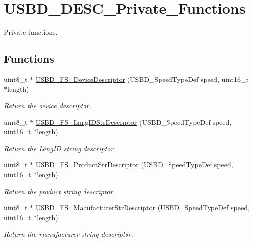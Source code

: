 \hypertarget{group__USBD__DESC__Private__Functions}{}\section{U\+S\+B\+D\+\_\+\+D\+E\+S\+C\+\_\+\+Private\+\_\+\+Functions}
\label{group__USBD__DESC__Private__Functions}


Private functions.  


\subsection*{Functions}
\begin{DoxyCompactItemize}
\item 
uint8\+\_\+t $\ast$ \hyperlink{group__USBD__DESC__Private__Functions_ga14798be38c08a37163e53167032485ff}{U\+S\+B\+D\+\_\+\+F\+S\+\_\+\+Device\+Descriptor} (U\+S\+B\+D\+\_\+\+Speed\+Type\+Def speed, uint16\+\_\+t $\ast$length)
\begin{DoxyCompactList}\small\item\em Return the device descriptor. \end{DoxyCompactList}\item 
uint8\+\_\+t $\ast$ \hyperlink{group__USBD__DESC__Private__Functions_gac02628ceb6a6a071e192dcb85063c0cc}{U\+S\+B\+D\+\_\+\+F\+S\+\_\+\+Lang\+I\+D\+Str\+Descriptor} (U\+S\+B\+D\+\_\+\+Speed\+Type\+Def speed, uint16\+\_\+t $\ast$length)
\begin{DoxyCompactList}\small\item\em Return the Lang\+ID string descriptor. \end{DoxyCompactList}\item 
uint8\+\_\+t $\ast$ \hyperlink{group__USBD__DESC__Private__Functions_ga0ec558c0303daabb851d584109a56514}{U\+S\+B\+D\+\_\+\+F\+S\+\_\+\+Product\+Str\+Descriptor} (U\+S\+B\+D\+\_\+\+Speed\+Type\+Def speed, uint16\+\_\+t $\ast$length)
\begin{DoxyCompactList}\small\item\em Return the product string descriptor. \end{DoxyCompactList}\item 
uint8\+\_\+t $\ast$ \hyperlink{group__USBD__DESC__Private__Functions_ga6427a671827813efe1a46c3dfcb05683}{U\+S\+B\+D\+\_\+\+F\+S\+\_\+\+Manufacturer\+Str\+Descriptor} (U\+S\+B\+D\+\_\+\+Speed\+Type\+Def speed, uint16\+\_\+t $\ast$length)
\begin{DoxyCompactList}\small\item\em Return the manufacturer string descriptor. \end{DoxyCompactList}\item 

\end{DoxyCompactItemize}
